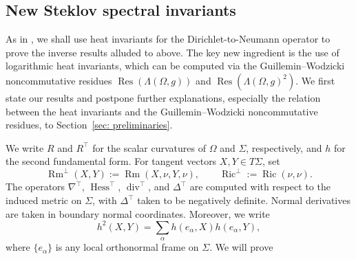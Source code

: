 \documentclass[11pt]{amsart}
\newcommand*{\Res}{\operatorname{Res}}
\newcommand{\Ric}{\operatorname{Ric}}
\newcommand{\Rm}{\operatorname{Rm}}
\theoremstyle{definition}
\numberwithin{equation}{section}
\begin{document}
	
	\subsection{New Steklov spectral invariants}
	
	As in \cite{polterovichHeatInvariantsSteklov2015}, we shall use heat invariants for the Dirichlet-to-Neumann operator to prove the inverse results alluded to above. The key new ingredient is the use of logarithmic heat invariants, which can be computed via the Guillemin--Wodzicki noncommutative residues  $\Res(\Lambda(\Omega,g))$ and  $\Res(\Lambda(\Omega,g)^2)$. We first state our results and postpone further explanations, especially the relation between the heat invariants and the Guillemin--Wodzicki noncommutative residues, to Section~\ref{sec: preliminaries}.
	
	We write $R$ and $R^\top$ for the scalar curvatures of $\Omega$ and $\Sigma$, respectively, and $h$ for the second fundamental form.  For tangent vectors
	$X,Y\in T\Sigma$, set
	\[
	\Rm^\perp(X,Y):=\Rm(X,\nu,Y,\nu), \qquad
	\Ric^\perp:=\Ric(\nu,\nu).
	\]
	The operators $\nabla^\top$, $\operatorname{Hess}^\top$, $\operatorname{div}^\top$, and $\Delta^\top$ are computed with respect to the induced metric on $\Sigma$, with $\Delta^\top$ taken to be negatively definite.  Normal derivatives are taken in boundary normal coordinates. Moreover, we write   
	\[ h^2(X,Y)=\sum_\alpha h(e_\alpha,X)h(e_\alpha,Y),\] where $\{e_\alpha\}$ is any local orthonormal frame  on $\Sigma$. We will prove 
	
\end{document}
